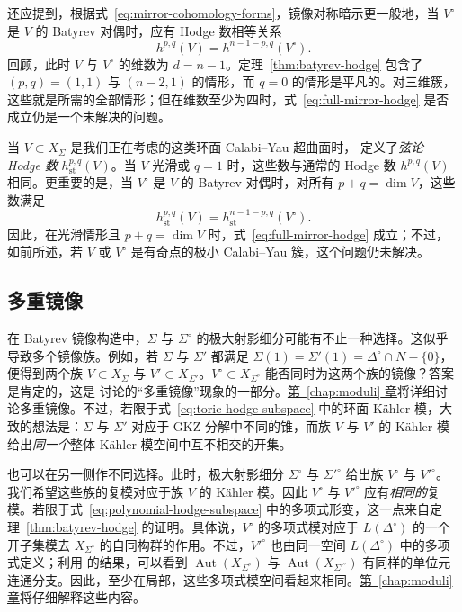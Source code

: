 还应提到，根据式~\eqref{eq:mirror-cohomology-forms}，镜像对称暗示更一般地，当 $V^\circ$ 是 $V$ 的 Batyrev 对偶时，应有 Hodge 数相等关系
\begin{equation}\label{eq:full-mirror-hodge}
h^{p,q}(V)=h^{n-1-p,q}(V^\circ).
\end{equation}
回顾，此时 $V$ 与 $V^\circ$ 的维数为 $d=n-1$。定理~\ref{thm:batyrev-hodge} 包含了 $(p,q)=(1,1)$ 与 $(n-2,1)$ 的情形，而 $q=0$ 的情形是平凡的。对三维簇，这些就是所需的全部情形；但在维数至少为四时，式~\eqref{eq:full-mirror-hodge} 是否成立仍是一个未解决的问题。

当 $V\subset X_\Sigma$ 是我们正在考虑的这类环面 Calabi--Yau 超曲面时， 定义了\emph{弦论 Hodge 数} $h_{\mathrm{st}}^{p,q}(V)$。当 $V$ 光滑或 $q=1$ 时，这些数与通常的 Hodge 数 $h^{p,q}(V)$ 相同。更重要的是，当 $V^\circ$ 是 $V$ 的 Batyrev 对偶时，对所有 $p+q=\dim V$，这些数满足
\[
h_{\mathrm{st}}^{p,q}(V)=h_{\mathrm{st}}^{n-1-p,q}(V^\circ).
\]
因此，在光滑情形且 $p+q=\dim V$ 时，式~\eqref{eq:full-mirror-hodge} 成立；不过，如前所述，若 $V$ 或 $V^\circ$ 是有奇点的极小 Calabi--Yau 簇，这个问题仍未解决。

\subsection{多重镜像}\label{subsec:multiple-mirrors}

在 Batyrev 镜像构造中，$\Sigma$ 与 $\Sigma^\circ$ 的极大射影细分可能有不止一种选择。这似乎导致多个镜像族。例如，若 $\Sigma$ 与 $\Sigma'$ 都满足 $\Sigma(1)=\Sigma'(1)=\Delta^\circ\cap N-\{0\}$，便得到两个族 $V\subset X_\Sigma$ 与 $V'\subset X_{\Sigma'}$。$V^\circ\subset X_{\Sigma^\circ}$ 能否同时为这两个族的镜像？答案是肯定的，这是  讨论的“多重镜像”现象的一部分。\hyperref[chap:moduli]{第~\ref*{chap:moduli} 章}将详细讨论多重镜像。不过，若限于式~\eqref{eq:toric-hodge-subspace} 中的环面 Kähler 模，大致的想法是：$\Sigma$ 与 $\Sigma'$ 对应于 GKZ 分解中不同的锥，而族 $V$ 与 $V'$ 的 Kähler 模给出\emph{同一个}整体 Kähler 模空间中互不相交的开集。

也可以在另一侧作不同选择。此时，极大射影细分 $\Sigma^\circ$ 与 $\Sigma'^\circ$ 给出族 $V^\circ$ 与 $V'^\circ$。我们希望这些族的复模对应于族 $V$ 的 Kähler 模。因此 $V^\circ$ 与 $V'^\circ$ 应有\emph{相同的}复模。若限于式~\eqref{eq:polynomial-hodge-subspace} 中的多项式形变，这一点来自定理~\ref{thm:batyrev-hodge} 的证明。具体说，$V^\circ$ 的多项式模对应于 $L(\Delta^\circ)$ 的一个开子集模去 $X_{\Sigma^\circ}$ 的自同构群的作用。不过，$V'^\circ$ 也由同一空间 $L(\Delta^\circ)$ 中的多项式定义；利用  的结果，可以看到 $\operatorname{Aut}(X_{\Sigma^\circ})$ 与 $\operatorname{Aut}(X_{\Sigma'^\circ})$ 有同样的单位元连通分支。因此，至少在局部，这些多项式模空间看起来相同。\hyperref[chap:moduli]{第~\ref*{chap:moduli} 章}将仔细解释这些内容。

